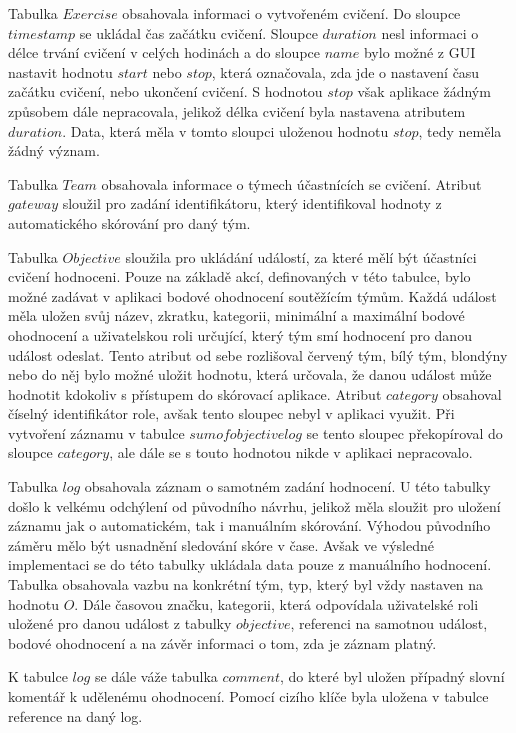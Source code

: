 \documentclass[
  digital, %
  twoside, %
  table,   %
  lof,     %
  lot,     %
]{fithesis3}
\begin{document}
Tabulka $Exercise$ obsahovala informaci o vytvořeném cvičení. Do sloupce $timestamp$ se ukládal čas začátku cvičení. Sloupce $duration$ nesl informaci o délce trvání cvičení v celých hodinách a do sloupce $name$ bylo možné z GUI nastavit hodnotu $start$ nebo $stop$, která označovala, zda jde o nastavení času začátku cvičení, nebo ukončení cvičení. S hodnotou $stop$ však aplikace žádným způsobem dále nepracovala, jelikož délka cvičení byla nastavena atributem $duration$. Data, která měla v tomto sloupci uloženou hodnotu $stop$, tedy neměla žádný význam.

Tabulka $Team$ obsahovala informace o týmech účastnících se cvičení. Atribut $gateway$ sloužil pro zadání identifikátoru, který identifikoval hodnoty z automatického skórování pro daný tým.

Tabulka $Objective$ sloužila pro ukládání událostí, za které mělí být účastníci cvičení hodnoceni. Pouze na základě akcí, definovaných v této tabulce, bylo možné zadávat v aplikaci bodové ohodnocení soutěžícím týmům. Každá událost měla uložen svůj název, zkratku, kategorii, minimální a maximální bodové ohodnocení a uživatelskou roli určující, který tým smí hodnocení pro danou událost odeslat. Tento atribut od sebe rozlišoval červený tým, bílý tým, blondýny nebo do něj bylo možné uložit hodnotu, která určovala, že danou událost může hodnotit kdokoliv s přístupem do skórovací aplikace. Atribut $category$ obsahoval číselný identifikátor role, avšak tento sloupec nebyl v aplikaci využit. Při vytvoření záznamu v tabulce $sumofobjectivelog$ se tento sloupec překopíroval do sloupce $category$, ale dále se s touto hodnotou nikde v aplikaci nepracovalo.

Tabulka $log$ obsahovala záznam o samotném zadání hodnocení. U této tabulky došlo k velkému odchýlení od původního návrhu, jelikož měla sloužit pro uložení záznamu jak o automatickém, tak i manuálním skórování. Výhodou původního záměru mělo být usnadnění sledování skóre v čase. Avšak ve výsledné implementaci se do této tabulky ukládala data pouze z manuálního hodnocení. Tabulka obsahovala vazbu na konkrétní tým, typ, který byl vždy nastaven na hodnotu $O$. Dále časovou značku, kategorii, která odpovídala uživatelské roli uložené pro danou událost z tabulky $objective$, referenci na samotnou událost, bodové ohodnocení a na závěr informaci o tom, zda je záznam platný. 

K tabulce $log$ se dále váže tabulka $comment$, do které byl uložen případný slovní komentář k udělenému ohodnocení. Pomocí cizího klíče byla uložena v tabulce reference na daný log.
\end{document}
